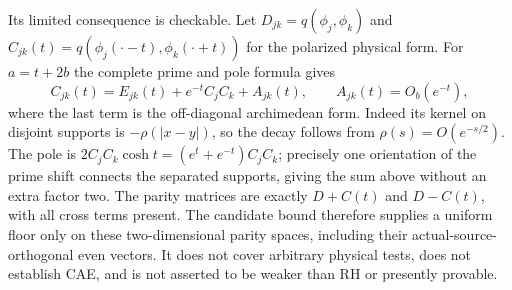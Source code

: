 Its limited consequence is checkable. Let
$D_{jk}=q(\phi_j,\phi_k)$ and
$C_{jk}(t)=q(\phi_j(\cdot-t),\phi_k(\cdot+t))$ for the polarized
physical form. For $a=t+2b$ the complete prime and pole formula gives
\[
 C_{jk}(t)=E_{jk}(t)+e^{-t}C_jC_k+A_{jk}(t),
 \qquad A_{jk}(t)=O_b(e^{-t}),
\]
where the last term is the off-diagonal archimedean form. Indeed its
kernel on disjoint supports is $-\rho(|x-y|)$, so the decay follows
from $\rho(s)=O(e^{-s/2})$. The pole is
$2C_jC_k\cosh t=(e^t+e^{-t})C_jC_k$; precisely one orientation of
the prime shift connects the separated supports, giving the sum above
without an extra factor two. The parity matrices are exactly
$D+C(t)$ and $D-C(t)$, with all cross terms present. The candidate
bound therefore supplies a uniform floor only on these two-dimensional
parity spaces, including their actual-source-orthogonal even vectors.
It does not cover arbitrary physical tests, does not establish CAE,
and is not asserted to be weaker than RH or presently provable.
